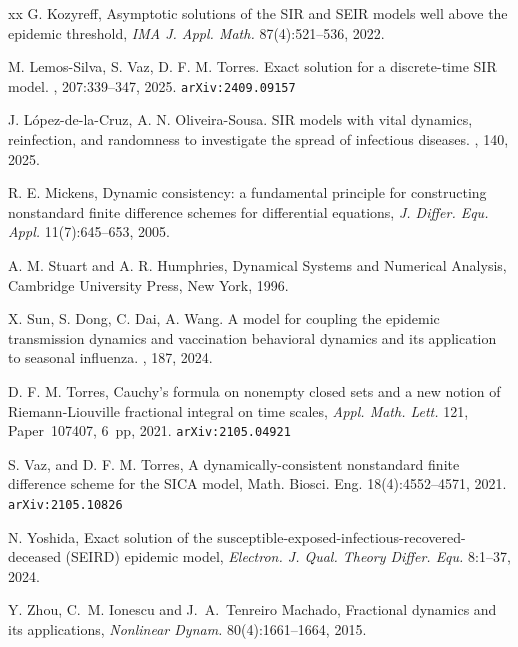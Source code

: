 \documentclass[pdflatex,sn-mathphys-num]{sn-jnl}
\theoremstyle{remark}
\begin{document}
\begin{thebibliography}{xx}
G. Kozyreff, 
Asymptotic solutions of the SIR and SEIR models 
well above the epidemic threshold,
{\em IMA J. Appl. Math.} 87(4):521--536, 2022.

M. Lemos-Silva, S. Vaz, D. F. M. Torres.
\newblock Exact solution for a discrete-time SIR model.
, 207:339--347, 2025.
{\tt arXiv:2409.09157}

J. López-de-la-Cruz, A. N. Oliveira-Sousa. 
\newblock SIR models with vital dynamics, reinfection, and randomness to investigate 
the spread of infectious diseases. 
, 140, 2025.

R. E. Mickens, 
Dynamic consistency: a fundamental principle for constructing nonstandard 
ﬁnite difference schemes for differential equations, 
{\em J. Differ. Equ. Appl.} 11(7):645--653, 2005.

A. M. Stuart and A. R. Humphries, 
Dynamical Systems and Numerical Analysis, 
Cambridge University Press, New York, 1996. 	

X. Sun, S. Dong, C. Dai, A. Wang.
\newblock A model for coupling the epidemic transmission dynamics and 
vaccination behavioral dynamics and its application to seasonal influenza.
, 187, 2024. 

D. F. M. Torres,  
Cauchy's formula on nonempty closed sets and a new notion of Riemann-Liouville 
fractional integral on time scales, 
{\em Appl. Math. Lett.} 121, Paper~107407, 6~pp, 2021.
{\tt arXiv:2105.04921}

S. Vaz, and D. F. M. Torres, 
A dynamically-consistent nonstandard finite difference scheme for the SICA model, 
Math. Biosci. Eng. 18(4):4552--4571, 2021.
{\tt arXiv:2105.10826}

N. Yoshida, 
Exact solution of the susceptible-exposed-infectious-recovered-deceased 
(SEIRD) epidemic model,
{\em Electron. J. Qual. Theory Differ. Equ.} 8:1--37, 2024.

Y. Zhou, C.~M. Ionescu and J.~A.~Tenreiro Machado, 
Fractional dynamics and its applications, 
{\em Nonlinear Dynam.} 80(4):1661--1664, 2015.

\end{thebibliography}

\end{document}

